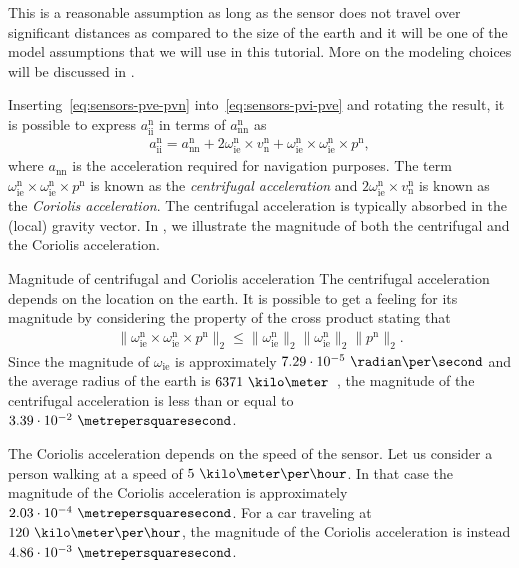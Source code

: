 This is a reasonable assumption as long as the sensor does not travel over significant distances as compared to the size of the earth and it will be one of the model assumptions that we will use in this tutorial. More on the modeling choices will be discussed in . 

Inserting~\eqref{eq:sensors-pve-pvn} into~\eqref{eq:sensors-pvi-pve} and rotating the result, it is possible to express $a_\text{ii}^\text{n}$ in terms of $a_\text{nn}^\text{n}$ as
\begin{align}
\label{eq:sensors-aii-ann} 
a_\text{ii}^\text{n} = 
a_\text{nn}^\text{n} + 
2 \omega_\text{ie}^\text{n} \times v^\text{n}_\text{n} + 
\omega_\text{ie}^\text{n} \times \omega_\text{ie}^\text{n}
\times p^\text{n},
\end{align}
where $a_\text{nn}$ is the acceleration required for navigation
purposes. The term $\omega_\text{ie}^\text{n} \times \omega_\text{ie}^\text{n}
\times p^\text{n}$ is known as the \emph{centrifugal acceleration} and $2 \omega_\text{ie}^\text{n} \times v^\text{n}_\text{n}$ is known as the \emph{Coriolis acceleration}. The centrifugal acceleration is typically absorbed in the (local) gravity vector. In , we illustrate the magnitude of both the centrifugal and the Coriolis acceleration.

\begin{myexample}{Magnitude of centrifugal and Coriolis acceleration}%
\label{ex:sensors-magCentrCor}%
The centrifugal acceleration depends on the location on the earth. It is possible to get a feeling for its magnitude by considering the property of the cross product stating that
\begin{align}
\| \omega_\text{ie}^\text{n} \times \omega_\text{ie}^\text{n} \times p^\text{n} \|_2 \leq 
\| \omega_\text{ie}^\text{n} \|_2 \| \omega_\text{ie}^\text{n} \|_2 \| p^\text{n} \|_2.
\end{align}
Since the magnitude of $\omega_\text{ie}$ is approximately $7.29 \cdot 10^{-5}~\radian\per\second$ and the average radius of the earth is $6371~\kilo\meter$~\citep{nasa:2016}, the magnitude of the centrifugal acceleration is less than or equal to $3.39 \cdot 10^{-2}~\metrepersquaresecond$. 

The Coriolis acceleration depends on the speed of the sensor. Let us consider a person walking at a speed of $5~\kilo\meter\per\hour$. In that case the magnitude of the Coriolis acceleration is approximately $2.03 \cdot 10^{-4}~\metrepersquaresecond$. For a car traveling at $120~\kilo\meter\per\hour$, the magnitude of the Coriolis acceleration is instead $4.86 \cdot 10^{-3}~\metrepersquaresecond$. 
\end{myexample}

